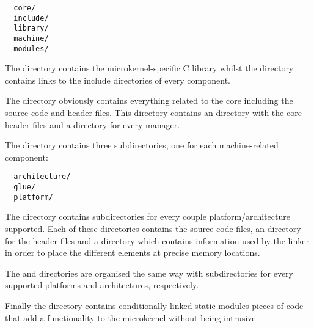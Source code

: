 \begin{verbatim}
  core/
  include/
  library/
  machine/
  modules/
\end{verbatim}

The  directory contains the microkernel-specific C library
whilst the  directory contains links to the include
directories of every component.

The  directory obviously contains everything related to the
core including the source code and header files. This directory contains
an  directory with the core header files and a directory
for every manager.

The  directory contains three subdirectories, one for each
machine-related component:

\begin{verbatim}
  architecture/
  glue/
  platform/
\end{verbatim}

The  directory contains subdirectories for every couple
platform/architecture supported. Each of these directories contains the
source code files, an  directory for the header files and
a  directory which contains information used by the linker
in order to place the different elements at precise memory locations.

The  and  directories are organised
the same way with subdirectories for every supported platforms and
architectures, respectively.

Finally the  directory contains conditionally-linked
static modules \ie{} pieces of code that add a functionality to the
microkernel without being intrusive.
